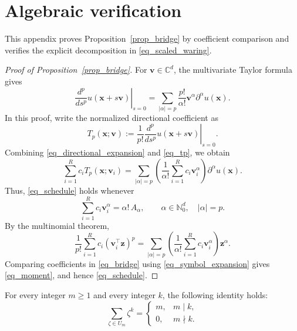 \documentclass[final,oneeqnum]{siamltex}
\newcommand{\C}{\mathbb{C}}
\newcommand{\N}{\mathbb{N}}
\newcommand{\bx}{\bm{x}}
\newcommand{\bz}{\bm{z}}
\newcommand{\bv}{\bm{v}}
\newcommand{\Tp}{T_{p}}
\newcommand{\abs}[1]{\left|#1\right|}
\begin{document}
\section{Algebraic verification}\label{sec_schedules}

This appendix proves Proposition~\ref{prop_bridge} by coefficient comparison and verifies the explicit decomposition in \eqref{eq_scaled_waring}.

\begin{proof}[Proof of Proposition~\ref{prop_bridge}]
    For $\bv \in \C^d$, the multivariate Taylor formula~\cite[Sec.~3.17]{LoomisSternberg1990} gives
    \begin{equation}\label{eq_directional_expansion}
        \left.\frac{d^p}{d s^p} u(\bx + s \bv)\right|_{s = 0} = \sum_{\abs{\alpha} = p} \frac{p!}{\alpha!} \bv^\alpha \partial^\alpha u(\bx).
    \end{equation}
    In this proof, write the normalized directional coefficient as
    \begin{equation}\label{eq_tp}
        \Tp(\bx; \bv) := \frac{1}{p!} \left.\frac{d^p}{d s^p} u(\bx + s \bv)\right|_{s = 0}.
    \end{equation}
    Combining \eqref{eq_directional_expansion} and \eqref{eq_tp}, we obtain
    \begin{equation}\label{eq_operator_rearranged}
        \sum_{i = 1}^{R} c_i \Tp(\bx; \bv_i) = \sum_{\abs{\alpha} = p} \left(\frac{1}{\alpha!} \sum_{i = 1}^{R} c_i \bv_i^\alpha\right) \partial^\alpha u(\bx).
    \end{equation}
    Thus, \eqref{eq_schedule} holds whenever
    \begin{equation}\label{eq_moment}
        \sum_{i = 1}^{R} c_i \bv_i^\alpha = \alpha! \, A_{\alpha}, \quad\quad \alpha \in \N_0^d, \quad \abs{\alpha} = p.
    \end{equation}
    By the multinomial theorem,
    \begin{equation}\label{eq_symbol_expansion}
        \frac{1}{p!} \sum_{i = 1}^{R} c_i (\bv_i^\top \bz)^p = \sum_{\abs{\alpha} = p} \left(\frac{1}{\alpha!} \sum_{i = 1}^{R} c_i \bv_i^\alpha\right) \bz^\alpha.
    \end{equation}
    Comparing coefficients in \eqref{eq_bridge} using \eqref{eq_symbol_expansion} gives \eqref{eq_moment}, and hence \eqref{eq_schedule}.
\end{proof}

\begin{lemma}\label{lem_filter}
    For every integer $m \ge 1$ and every integer $k$, the following identity holds:
    \begin{equation}\label{eq_filter}
        \sum_{\zeta \in U_m} \zeta^k
        =
        \begin{cases}
            m, & m \mid k,  \\
            0, & m \nmid k.
        \end{cases}
    \end{equation}
\end{lemma}
\end{document}
